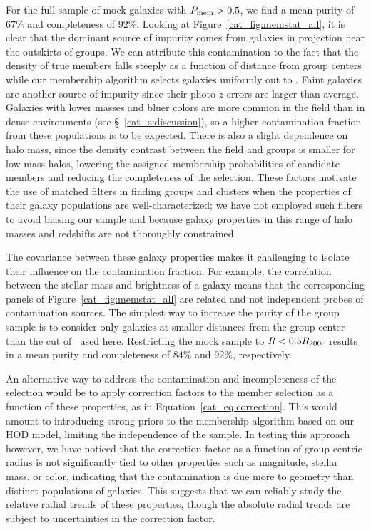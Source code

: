For the full sample of mock galaxies with $P_{\rm mem}>0.5$, we find a
mean purity of $67\%$ and completeness of $92\%$. Looking at
Figure~\ref{cat_fig:memstat_all}, it is clear that the dominant source of
impurity comes from galaxies in projection near the outskirts of
groups. We can attribute this contamination to the fact that the
density of true members falls steeply as a function of distance from
group centers while our membership algorithm selects galaxies
uniformly out to \rvir. Faint galaxies are another source of impurity since their
photo-$z$ errors are larger than average. Galaxies with lower masses and
bluer colors are more common in the field than in dense environments
(see \S~\ref{cat_s:discussion}), so a higher contamination fraction from
these populations is to be expected. There is also a slight dependence on halo 
mass, since the density contrast between the field and groups is
smaller for low mass halos, lowering the assigned membership
probabilities of candidate members and reducing the completeness of
the selection. These factors motivate the use of matched filters in
finding groups and clusters when the properties of their galaxy
populations are well-characterized; we have not employed such filters
to avoid biasing our sample and because galaxy properties in this
range of halo masses and redshifts are not thoroughly constrained.

The covariance between these galaxy properties makes it challenging to
isolate their influence on the contamination fraction. For example,
the correlation between the stellar mass and brightness of a
galaxy means that the corresponding panels of
Figure~\ref{cat_fig:memstat_all} are related and not independent probes of
contamination sources. The simplest
way to increase the purity of the group sample is to consider only
galaxies at smaller distances from the group center than the cut of
\rvir\ used here. Restricting the mock sample to $R<0.5\mbox{$R_{200\rm{c}}$}$ results
in a mean purity and completeness of $84\%$ and $92\%$, respectively.

An alternative way to address the contamination and incompleteness of
the selection would be to apply correction factors to the member
selection as a function of these properties, as in
Equation~\ref{cat_eq:correction}. This would amount to introducing strong 
priors to the membership algorithm based on our HOD model, limiting
the independence of the sample. In testing this approach however, we
have noticed that the correction factor as a function of group-centric
radius is not significantly tied to other properties such as
magnitude, stellar mass, or color, indicating that the contamination
is due more to geometry than distinct populations of galaxies. This
suggests that we can reliably study the relative radial trends of
these properties, though the absolute radial trends are subject to
uncertainties in the correction factor.


